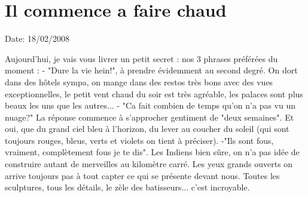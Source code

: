 \section{Il commence a faire chaud}

Date: 18/02/2008

\begin{multicols}{2}

Aujourd'hui, je vais vous livrer un petit secret : nos 3 phrases préférées du moment :
- "Dure la vie hein!", à prendre évidemment au second degré. On dort dans des hôtels sympa, on mange dans des restos très bons avec des vues exceptionnelles, le petit vent chaud du soir est très agréable, les palaces sont plus beaux les uns que les autres...
- "Ca fait combien de temps qu'on n'a pas vu un nuage?" La réponse commence à s'approcher gentiment de "deux semaines". Et oui, que du grand ciel bleu à l'horizon, du lever au coucher du soleil (qui sont toujours rouges, bleus, verts et violets on tient à préciser).
-"Ils sont fous, vraiment, complètement fous je te dis". Les Indiens bien sûre, on n'a pas idée de construire autant de merveilles au kilomètre carré. Les yeux grands ouverts on arrive toujours pas à tout capter ce qui se présente devant nous. Toutes les sculptures, tous les détails, le zèle des batisseurs... c'est incroyable.


\end{multicols}
